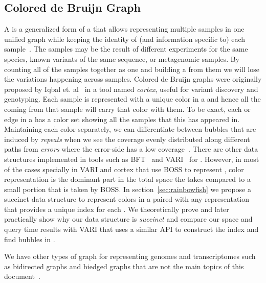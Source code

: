 \subsection{Colored de Bruijn Graph}
A \cdbg is a generalized form of a \dbg that allows representing multiple samples in one unified graph while keeping the identity of (and information specific to) each sample~\cite{Iqbal2012Novo}. The samples may be the result of different experiments for the same species, known variants of the same sequence, or metagenomic samples. By counting all of the samples together as one and building a \dbg from them we will lose the variations happening across samples. Colored de Bruijn graphs were originally proposed by Iqbal et. al~\cite{Iqbal2012Novo}  in a tool named \emph{cortex}, useful for variant discovery and genotyping. Each sample is represented with a unique color in a \cdbg and hence all the \kmers coming from that sample will carry that color with them. To be exact, each \kmer or edge in a \cdbg has a color set showing all the samples that this \kmer has appeared in. Maintaining each color separately, we can differentiate between bubbles that are induced by \emph{repeats} when we see the coverage evenly distributed along different paths from \emph{errors} where the error-side has a low coverage~\cite{Iqbal2012Novo}. There are other data structures implemented in tools such as BFT~\cite{holley2016bloom} and VARI~\cite{MuggliBoNo17} for \cdbg. However, in most of the cases specially in VARI and cortex that use BOSS to represent \dbg, color representation is the dominant part in the total space the \cdbg takes compared to a small portion that is taken by BOSS. In section~\ref{sec:rainbowfish} we propose a succinct data structure to represent colors in a \cdbg paired with any \dbg representation that provides a unique index for each \kmer. We theoretically prove and later practically show why our data structure is \emph{succinct} and compare our space and query time results with VARI that uses a similar API to construct the index and find bubbles in \cdbg.


We have other types of graph for representing genomes and transcriptomes such as bidirected graphs \cite{edmonds2003matching,medvedev2009maximum} and biedged graphs that are not the main topics of this document~\cite{paten2017genome}.


